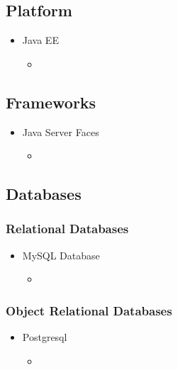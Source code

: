 \subsection{Platform}
\begin{itemize}
		\item Java EE
	\begin{itemize}
		\item 
	\end{itemize}
\end{itemize}

\subsection{Frameworks}
\begin{itemize}
		\item Java Server Faces
	\begin{itemize}
		\item 
	\end{itemize}
\end{itemize}
	
	
\subsection{Databases}
\subsubsection{Relational Databases}
\begin{itemize}
	\item MySQL Database
	\begin{itemize}
	\item 
	\end{itemize}
\end{itemize}
	
\subsubsection{Object Relational Databases}
\begin{itemize}
	\item Postgresql
	\begin{itemize}
	\item 
	\end{itemize}
\end{itemize}

